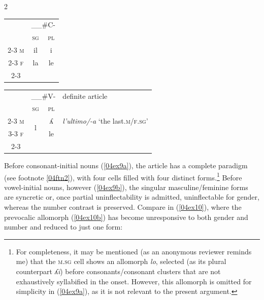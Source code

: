 \documentclass[output=paper,colorlinks,citecolor=brown]{langscibook}
\begin{document}
\noindent \begin{minipage}{0.65\textwidth}
\begin{multicols}{2}

\begin{exe}
	\ex \label{04ex9}
	\begin{xlist}
		\ex \label{04ex9a}
			\begin{tabularx}{\textwidth}{ccc}
					& \multicolumn{2}{c}{\_\_\#C-} \\
					& \textsc{sg} & \textsc{pl} \\
					\cline{2-3}
					\textsc{m} & \multicolumn{1}{|c|}{il} & \multicolumn{1}{c|}{i} \\
					\cline{2-3}
					\textsc{f} & \multicolumn{1}{|c|}{la} & \multicolumn{1}{c|}{le} \\
					\cline{2-3}
			\end{tabularx}
	
		\ex \label{04ex9b}
			\begin{tabularx}{\textwidth}{cccl}
				& \multicolumn{2}{c}{\_\_\#V-} & \ili{Italian} definite article \\
				& \textsc{sg} & \textsc{pl} & \\
				\cline{2-3}
				\textsc{m} & \multicolumn{1}{|c|}{\multirow{2}{*}{l}} & \multicolumn{1}{c|}{ʎ} & \emph{l’ultimo/-a} ‘the last.\textsc{m/f.sg}’ \\
				\cline{3-3}
				\textsc{f} & \multicolumn{1}{|c|}{} & \multicolumn{1}{c|}{le} & \\
				\cline{2-3}
			\end{tabularx}
	\end{xlist}
\end{exe}

\end{multicols}
\end{minipage}

\bigskip

Before consonant-initial nouns (\ref{04ex9a}), the article has a complete paradigm (see footnote \ref{04ftn2}), with four cells filled with four distinct forms.\footnote{For completeness, it may be mentioned (as an anonymous reviewer reminds me) that the \textsc{m.sg} cell shows an allomorph \emph{lo}, selected (as its plural counterpart \emph{ʎi}) before consonants/consonant clusters that are not exhaustively syllabified in the onset. However, this allomorph is omitted for simplicity in (\ref{04ex9a}), as it is not relevant to the present argument.} Before vowel-initial nouns, however (\ref{04ex9b}), the singular masculine/feminine forms are syncretic or, once partial uninflectability is admitted, uninflectable for gender, whereas the number contrast is preserved. Compare  in (\ref{04ex10}), where the prevocalic allomorph
(\ref{04ex10b}) has become unresponsive to both gender and number and reduced to just one form:
\end{document}
